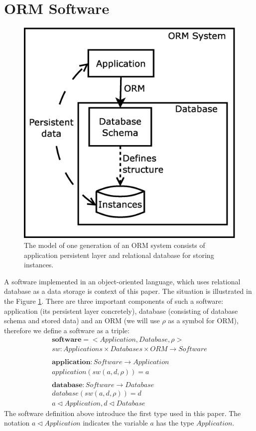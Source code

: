 \documentclass[11pt]{article}
\begin{document}
\section{ORM Software}
\label{sec:evoIntro}
\begin{figure}
\centering
	\includegraphics[scale=0.3]{./images/system}
	\caption{The model of one generation of an ORM system consists of application persistent layer and relational database for storing instances.}
\label{fig:appStructure}
\end{figure}
A software implemented in an object-oriented language, which uses relational database as a data storage is context of this paper. The situation is illustrated in the Figure \ref{fig:appStructure}. There are three important components of such a software: application (its persistent layer concretely), database (consisting of database schema and stored data) and an ORM (we will use $\rho$ as a symbol for ORM), therefore we define a software as a triple:
\begin{align*}
	\mathbf{software} = < Application, Database, \rho > \\
	sw : Applications \times Databases \times ORM \rightarrow Software \\ \\
	\mathbf{application} : Software \rightarrow Application \\
	application(sw(a, d, \rho)) = a \\ \\
	\mathbf{database} : Software \rightarrow Database \\
	database(sw(a, d, \rho)) = d \\
	a \lhd Application, d \lhd Database
\end{align*}
The software definition above introduce the first type used in this paper. The notation $a \lhd Application$ indicates the variable $a$ has the type $Application$.
\end{document}
